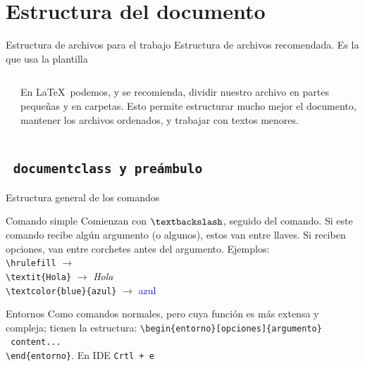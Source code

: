 \documentclass[12pt]{beamer}
\begin{document}
\section{Estructura del documento}

\begin{frame}{Estructura de archivos para el trabajo}
	Estructura de archivos recomendada. Es la que usa la plantilla
	\begin{columns}
		\begin{column}{0.4\textwidth}
		\end{column}
		\begin{column}{0.6\textwidth}
			En \LaTeX\ podemos, y se recomienda, dividir nuestro archivo en partes pequeñas y en carpetas. Esto permite estructurar mucho mejor el documento, mantener los archivos ordenados, y trabajar con textos menores.
		\end{column}
	\end{columns}
\end{frame}

\subsection{\texttt{\ documentclass y preámbulo}}

\begin{frame}{Estructura general de los comandos}
	\begin{block}{Comando simple}
		Comienzan con $\textbackslash$, seguido del comando. Si este comando recibe algún argumento (o algunos), estos van entre llaves. Si reciben opciones, van entre corchetes antes del argumento. Ejemplos: \\
		\verb|\hrulefill| $\rightarrow$ \hrulefill \\
		\verb|\textit{Hola}| $\rightarrow$ \textit{Hola} \\
		\verb|\textcolor{blue}{azul}| $\rightarrow$ \textcolor{blue}{azul}
	\end{block} \pause
	\begin{block}{Entornos}
		Como comandos normales, pero cuya función es más extensa y compleja; tienen la estructura: \verb|\begin{entorno}[opciones]{argumento}| \\ \verb| content... | \\ 
	\verb|\end{entorno}|. En IDE \texttt{Crtl + e}
	\end{block}
\end{frame}
\end{document}

